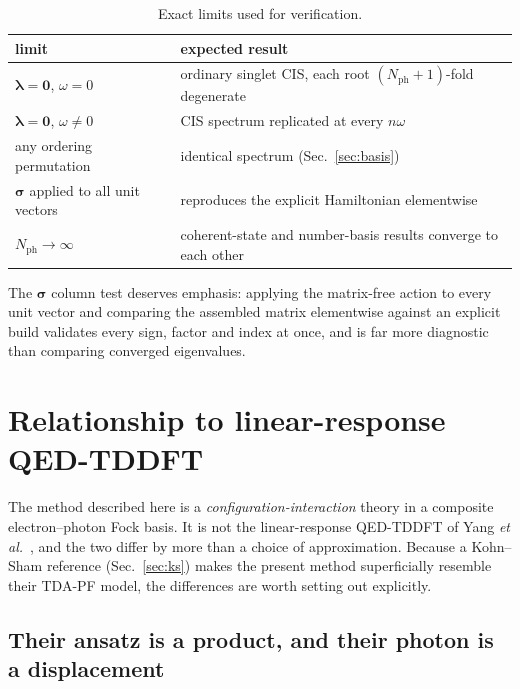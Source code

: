 \documentclass[11pt]{article}
\newcommand{\lam}{\bm{\lambda}}
\newcommand{\nph}{N_{\mathrm{ph}}}
\begin{document}
\begin{table}[h]
\centering
\small
\begin{tabular}{@{}ll@{}}
\toprule
limit & expected result \\
\midrule
$\lam = \bm{0}$, $\omega = 0$ & ordinary singlet CIS, each root $(\nph+1)$-fold degenerate \\
$\lam = \bm{0}$, $\omega \ne 0$ & CIS spectrum replicated at every $n\omega$ \\
any ordering permutation & identical spectrum (Sec.~\ref{sec:basis}) \\
$\bm{\sigma}$ applied to all unit vectors & reproduces the explicit Hamiltonian elementwise \\
$\nph \to \infty$ & coherent-state and number-basis results converge to each other \\
\bottomrule
\end{tabular}
\caption{Exact limits used for verification.}
\end{table}

\noindent
The $\bm{\sigma}$ column test deserves emphasis: applying the matrix-free action
to every unit vector and comparing the assembled matrix elementwise against an
explicit build validates every sign, factor and index at once, and is far more
diagnostic than comparing converged eigenvalues.

\section{Relationship to linear-response QED-TDDFT}
\label{sec:vsqedtddft}

The method described here is a \emph{configuration-interaction} theory in a
composite electron--photon Fock basis. It is not the linear-response
QED-TDDFT of Yang \emph{et al.}~\cite{Yang2021}, and the two differ by more than
a choice of approximation. Because a Kohn--Sham reference (Sec.~\ref{sec:ks})
makes the present method superficially resemble their TDA-PF model, the
differences are worth setting out explicitly.

\subsection{Their ansatz is a product, and their photon is a displacement}
\end{document}
